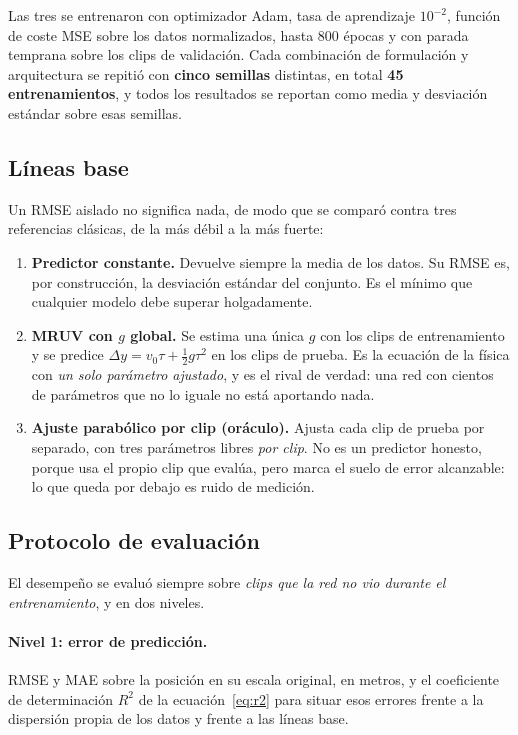 \documentclass[titlepage,11pt]{article}
\begin{document}
Las tres se entrenaron con optimizador Adam, tasa de aprendizaje $10^{-2}$,
función de coste MSE sobre los datos normalizados, hasta 800 épocas y con
parada temprana sobre los clips de validación. Cada combinación de formulación
y arquitectura se repitió con \textbf{cinco semillas} distintas, en total
\textbf{45 entrenamientos}, y todos los resultados se reportan como media y
desviación estándar sobre esas semillas.

\subsection{Líneas base}
\label{subsec:baselines}

Un RMSE aislado no significa nada, de modo que se comparó contra tres
referencias clásicas, de la más débil a la más fuerte:

\begin{enumerate}
\item \textbf{Predictor constante.} Devuelve siempre la media de los datos. Su
  RMSE es, por construcción, la desviación estándar del conjunto. Es el mínimo
  que cualquier modelo debe superar holgadamente.
\item \textbf{MRUV con $g$ global.} Se estima una única $g$ con los clips de
  entrenamiento y se predice $\Delta y = v_0\tau+\tfrac{1}{2}g\tau^2$ en los
  clips de prueba. Es la ecuación de la física con \emph{un solo parámetro
  ajustado}, y es el rival de verdad: una red con cientos de parámetros que no
  lo iguale no está aportando nada.
\item \textbf{Ajuste parabólico por clip (oráculo).} Ajusta cada clip de prueba
  por separado, con tres parámetros libres \emph{por clip}. No es un predictor
  honesto, porque usa el propio clip que evalúa, pero marca el suelo de error
  alcanzable: lo que queda por debajo es ruido de medición.
\end{enumerate}

\subsection{Protocolo de evaluación}
\label{sec:protocolo}

El desempeño se evaluó siempre sobre \emph{clips que la red no vio durante el
entrenamiento}, y en dos niveles.

\paragraph{Nivel 1: error de predicción.} RMSE y MAE sobre la posición
en su escala original, en metros, y el coeficiente de determinación $R^2$ de la
ecuación~\eqref{eq:r2} para situar esos errores frente a la dispersión propia
de los datos y frente a las líneas base.
\end{document}
